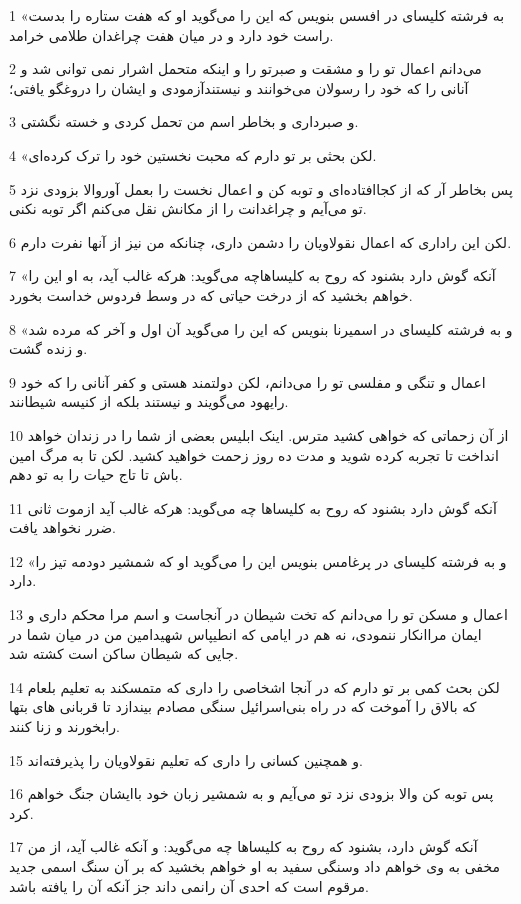 \par 1 «به فرشته کلیسای در افسس بنویس که این را می‌گوید او که هفت ستاره را بدست راست خود دارد و در میان هفت چراغدان طلامی خرامد.
\par 2 می‌دانم اعمال تو را و مشقت و صبرتو را و اینکه متحمل اشرار نمی توانی شد و آنانی را که خود را رسولان می‌خوانند و نیستندآزمودی و ایشان را دروغگو یافتی؛
\par 3 و صبرداری و بخاطر اسم من تحمل کردی و خسته نگشتی.
\par 4 «لکن بحثی بر تو دارم که محبت نخستین خود را ترک کرده‌ای.
\par 5 پس بخاطر آر که از کجاافتاده‌ای و توبه کن و اعمال نخست را بعمل آوروالا بزودی نزد تو می‌آیم و چراغدانت را از مکانش نقل می‌کنم اگر توبه نکنی.
\par 6 لکن این راداری که اعمال نقولاویان را دشمن داری، چنانکه من نیز از آنها نفرت دارم.
\par 7 «آنکه گوش دارد بشنود که روح به کلیساهاچه می‌گوید: هر‌که غالب آید، به او این را خواهم بخشید که از درخت حیاتی که در وسط فردوس خداست بخورد.
\par 8 «و به فرشته کلیسای در اسمیرنا بنویس که این را می‌گوید آن اول و آخر که مرده شد و زنده گشت.
\par 9 اعمال و تنگی و مفلسی تو را می‌دانم، لکن دولتمند هستی و کفر آنانی را که خود رایهود می‌گویند و نیستند بلکه از کنیسه شیطانند.
\par 10 از آن زحماتی که خواهی کشید مترس. اینک ابلیس بعضی از شما را در زندان خواهد انداخت تا تجربه کرده شوید و مدت ده روز زحمت خواهید کشید. لکن تا به مرگ امین باش تا تاج حیات را به تو دهم.
\par 11 آنکه گوش دارد بشنود که روح به کلیساها چه می‌گوید: هر‌که غالب آید ازموت ثانی ضرر نخواهد یافت.
\par 12 «و به فرشته کلیسای در پرغامس بنویس این را می‌گوید او که شمشیر دودمه تیز را دارد.
\par 13 اعمال و مسکن تو را می‌دانم که تخت شیطان در آنجاست و اسم مرا محکم داری و ایمان مراانکار ننمودی، نه هم در ایامی که انطیپاس شهیدامین من در میان شما در جایی که شیطان ساکن است کشته شد.
\par 14 لکن بحث کمی بر تو دارم که در آنجا اشخاصی را داری که متمسکند به تعلیم بلعام که بالاق را آموخت که در راه بنی‌اسرائیل سنگی مصادم بیندازد تا قربانی های بتها رابخورند و زنا کنند.
\par 15 و همچنین کسانی را داری که تعلیم نقولاویان را پذیرفته‌اند.
\par 16 پس توبه کن والا بزودی نزد تو می‌آیم و به شمشیر زبان خود باایشان جنگ خواهم کرد.
\par 17 آنکه گوش دارد، بشنود که روح به کلیساها چه می‌گوید: و آنکه غالب آید، از من مخفی به وی خواهم داد وسنگی سفید به او خواهم بخشید که بر آن سنگ اسمی جدید مرقوم است که احدی آن رانمی داند جز آنکه آن را یافته باشد.
